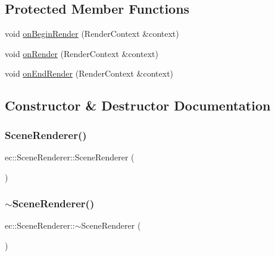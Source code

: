 \subsection*{Protected Member Functions}
\begin{DoxyCompactItemize}
\item 
void \mbox{\hyperlink{classec_1_1_scene_renderer_ad1d418d6caa7ada328ae9648663c2d23}{on\+Begin\+Render}} (Render\+Context \&context)
\item 
void \mbox{\hyperlink{classec_1_1_scene_renderer_a3d57e498fde970f039783f7ee8b015fc}{on\+Render}} (Render\+Context \&context)
\item 
void \mbox{\hyperlink{classec_1_1_scene_renderer_ae4c7c5bfe81b36ab18e36c2ea75ea53b}{on\+End\+Render}} (Render\+Context \&context)
\end{DoxyCompactItemize}


\subsection{Constructor \& Destructor Documentation}
\mbox{\label{classec_1_1_scene_renderer_a7759ceff361e2d9b90ffe35ee61dc8c2}} 
\subsubsection{\texorpdfstring{Scene\+Renderer()}{SceneRenderer()}}
{\footnotesize\ttfamily ec\+::\+Scene\+Renderer\+::\+Scene\+Renderer (\begin{DoxyParamCaption}{ }\end{DoxyParamCaption})\hspace{0.3cm}{\ttfamily [explicit]}}

\mbox{\label{classec_1_1_scene_renderer_ae8350e90e64b53e3dfb121c11a9d3283}} 
\subsubsection{\texorpdfstring{$\sim$\+Scene\+Renderer()}{~SceneRenderer()}}
{\footnotesize\ttfamily ec\+::\+Scene\+Renderer\+::$\sim$\+Scene\+Renderer (\begin{DoxyParamCaption}{ }\end{DoxyParamCaption})\hspace{0.3cm}{\ttfamily [default]}}



